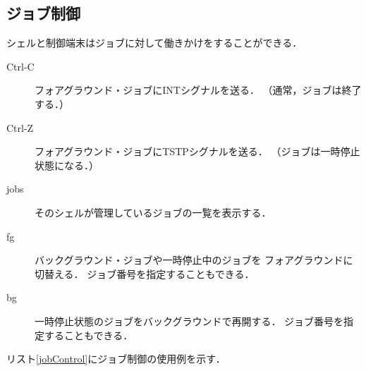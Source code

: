 

\subsection{ジョブ制御}
シェルと制御端末はジョブに対して働きかけをすることができる．

\begin{description}
\item[Ctrl-C] フォアグラウンド・ジョブにINTシグナルを送る．
（通常，ジョブは終了する．）

\item[Ctrl-Z] フォアグラウンド・ジョブにTSTPシグナルを送る．
（ジョブは一時停止状態になる．）

\item[jobs] そのシェルが管理しているジョブの一覧を表示する．

\item[fg] バックグラウンド・ジョブや一時停止中のジョブを
フォアグラウンドに切替える．
ジョブ番号を指定することもできる．

\item[bg] 一時停止状態のジョブをバックグラウンドで再開する．
ジョブ番号を指定することもできる．
\end{description}

リスト\ref{jobControl}にジョブ制御の使用例を示す．




